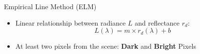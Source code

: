 \documentclass[mathserif]{beamer}
\begin{document}
\begin{frame}{}
\begin{columns}[t]
\begin{column}{.3\linewidth}
\begin{block}{Empirical Line Method (ELM)}
\begin{itemize}
  \item \small Linear relationship between radiance $L$ and reflectance $r_d$:
\begin{equation}\label{eq:ELM}
  L(\lambda)=m\times r_d(\lambda)+b
\end{equation}

\vspace{0.005cm}
\item \small At least two pixels from the scene: {\bf \small Dark} and {\bf \small Bright} Pixels

\end{itemize}








\vspace{-.5cm}
\end{block}


\end{column}
\end{columns}
\end{frame}
\end{document}
